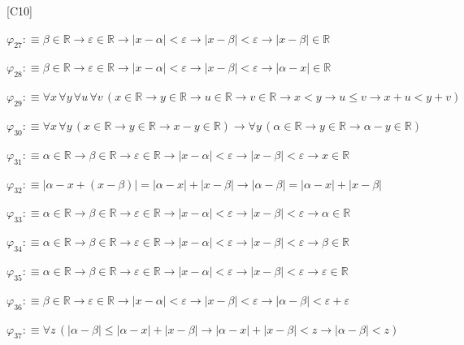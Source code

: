 \begin{fullproof}{[C10]}
\begin{abbrevlist}
\item $\varphi_{27} :\equiv \beta \in \mathbb{R} \to \varepsilon \in \mathbb{R} \to \lvert x - \alpha \rvert < \varepsilon \to \lvert x - \beta \rvert < \varepsilon \to \lvert x - \beta \rvert \in \mathbb{R}$
\item $\varphi_{28} :\equiv \beta \in \mathbb{R} \to \varepsilon \in \mathbb{R} \to \lvert x - \alpha \rvert < \varepsilon \to \lvert x - \beta \rvert < \varepsilon \to \lvert \alpha - x \rvert \in \mathbb{R}$
\item $\varphi_{29} :\equiv \forall x\,\forall y\,\forall u\,\forall v\,(x \in \mathbb{R} \to y \in \mathbb{R} \to u \in \mathbb{R} \to v \in \mathbb{R} \to x < y \to u \leq v \to x + u < y + v)$
\item $\varphi_{30} :\equiv \forall x\,\forall y\,(x \in \mathbb{R} \to y \in \mathbb{R} \to x - y \in \mathbb{R}) \to \forall y\,(\alpha \in \mathbb{R} \to y \in \mathbb{R} \to \alpha - y \in \mathbb{R})$
\item $\varphi_{31} :\equiv \alpha \in \mathbb{R} \to \beta \in \mathbb{R} \to \varepsilon \in \mathbb{R} \to \lvert x - \alpha \rvert < \varepsilon \to \lvert x - \beta \rvert < \varepsilon \to x \in \mathbb{R}$
\item $\varphi_{32} :\equiv \lvert \alpha - x + (x - \beta) \rvert = \lvert \alpha - x \rvert + \lvert x - \beta \rvert \to \lvert \alpha - \beta \rvert = \lvert \alpha - x \rvert + \lvert x - \beta \rvert$
\item $\varphi_{33} :\equiv \alpha \in \mathbb{R} \to \beta \in \mathbb{R} \to \varepsilon \in \mathbb{R} \to \lvert x - \alpha \rvert < \varepsilon \to \lvert x - \beta \rvert < \varepsilon \to \alpha \in \mathbb{R}$
\item $\varphi_{34} :\equiv \alpha \in \mathbb{R} \to \beta \in \mathbb{R} \to \varepsilon \in \mathbb{R} \to \lvert x - \alpha \rvert < \varepsilon \to \lvert x - \beta \rvert < \varepsilon \to \beta \in \mathbb{R}$
\item $\varphi_{35} :\equiv \alpha \in \mathbb{R} \to \beta \in \mathbb{R} \to \varepsilon \in \mathbb{R} \to \lvert x - \alpha \rvert < \varepsilon \to \lvert x - \beta \rvert < \varepsilon \to \varepsilon \in \mathbb{R}$
\item $\varphi_{36} :\equiv \beta \in \mathbb{R} \to \varepsilon \in \mathbb{R} \to \lvert x - \alpha \rvert < \varepsilon \to \lvert x - \beta \rvert < \varepsilon \to \lvert \alpha - \beta \rvert < \varepsilon + \varepsilon$
\item $\varphi_{37} :\equiv \forall z\,(\lvert \alpha - \beta \rvert \leq \lvert \alpha - x \rvert + \lvert x - \beta \rvert \to \lvert \alpha - x \rvert + \lvert x - \beta \rvert < z \to \lvert \alpha - \beta \rvert < z)$

\end{abbrevlist}
\end{fullproof}
